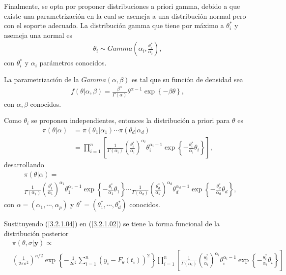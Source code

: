 Finalmente, se opta por proponer distribuciones a priori gamma, debido a que existe una parametrización en la cual se asemeja a una distribución normal pero con el soporte adecuado. La distribución gamma que tiene por  máximo a $\theta_{i}^{*}$ y asemeja una normal es 
\begin{align}
    \theta_i \sim Gamma\left(\alpha_i, \frac{\theta_i^{*}}{\alpha_i} \right),
    \label{3.2.1.03}
\end{align}
con $\theta_i^{*}$ y $\alpha_i$ parámetros conocidos.

La parametrización de la $Gamma(\alpha,\beta)$ es tal que su función de densidad sea
\begin{align*}
    f(\theta|\alpha,\beta) = \frac{\beta^\alpha}{\Gamma(\alpha)} \theta^{\alpha-1} \exp \left \{ -\beta \theta\right \},
\end{align*}
con $\alpha,\beta$ conocidos.

Como $\theta_i$ se proponen independientes, entonces la distribución a priori para $\theta$ es
\begin{align}
    \pi(\theta|\alpha) &= \pi(\theta_1|\alpha_1) \cdots \pi(\theta_d|\alpha_d) \nonumber \\
    &= \prod_{i = 1}^{n} \left[\frac{1}{\Gamma(\alpha_i)}\left(\frac{\theta_i^{*}}{\alpha_i}\right) ^{\alpha_i} \theta_i^{\alpha_i -1} \exp \left \{ -\frac{\theta_i^{*}}{\alpha_i}\theta_i\right \}\right],
    \label{3.2.1.04}
\end{align}
desarrollando
\begin{align}
    &\pi(\theta|\alpha) =  \nonumber \\
    &\frac{1}{\Gamma(\alpha_1)}\left(\frac{\theta_1^{*}}{\alpha_1}\right) ^{\alpha_1} \theta_1^{\alpha_1 -1} \exp \left \{ -\frac{\theta_1^{*}}{\alpha_1}\theta_1\right \}  \cdots \frac{1}{\Gamma(\alpha_d)}\left(\frac{\theta_d^{*}}{\alpha_d}\right) ^{\alpha_d} \theta_d^{\alpha_d -1} \exp \left \{ -\frac{\theta_d^{*}}{\alpha_d}\theta_d\right \},
    \label{3.2.1.05}
\end{align}
con $\alpha = (\alpha_1,\cdots, \alpha_p)$ y $\theta^{*} = (\theta_1^{*}, \cdots , \theta_d^{*})$ conocidos.

Sustituyendo (\ref{3.2.1.04}) en (\ref{3.2.1.02}) se tiene la forma funcional de la distribución posterior
\begin{align}
    &\pi(\theta, \sigma|\mathbf{y}) \propto  \nonumber\\ &\left(\frac{1}{2\pi \sigma^2}\right) ^{n/2}\exp \left \{  -\frac{1}{2\sigma^2}\sum_{i = 1}^{n} \left(y_i - F_{\theta}(t_i)\right)^2 \right \} \prod_{i = 1}^{n} \left[\frac{1}{\Gamma(\alpha_i)}\left(\frac{\theta_i^{*}}{\alpha_i}\right) ^{\alpha_i} \theta_i^{\alpha_i -1} \exp \left \{ -\frac{\theta_i^{*}}{\alpha_i}\theta_i\right \}\right] 
    \label{3.2.1.06}
\end{align}

